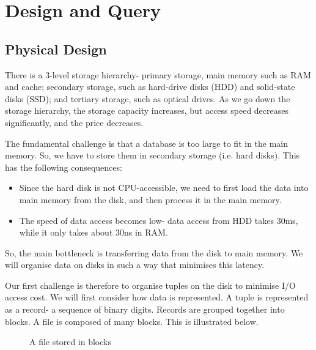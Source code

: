 \documentclass[a4paper, openany]{memoir}
\begin{document}
\chapter{Design and Query}
\section{Physical Design}
There is a 3-level storage hierarchy- primary storage, main memory such as RAM and cache; secondary storage, such as hard-drive disks (HDD) and solid-state disks (SSD); and tertiary storage, such as optical drives. As we go down the storage hierarchy, the storage capacity increases, but access speed decreases significantly, and the price decreases.

The fundamental challenge is that a database is too large to fit in the main memory. So, we have to store them in secondary storage (i.e. hard disks). This has the following consequences:
\begin{itemize}
    \item Since the hard disk is not CPU-accessible, we need to first load the data into main memory from the disk, and then process it in the main memory.
    \item The speed of data access becomes low- data access from HDD takes 30ms, while it only takes about 30ns in RAM.
\end{itemize}
So, the main bottleneck is transferring data from the disk to main memory. We will organise data on disks in such a way that minimises this latency.

Our first challenge is therefore to organise tuples on the disk to minimise I/O access cost. We will first consider how data is represented. A tuple is represented as a record- a sequence of binary digits. Records are grouped together into blocks. A file is composed of many blocks. This is illustrated below.
\begin{figure}[H]
    \centering
    \caption{A file stored in blocks}
\end{figure}
\end{document}
